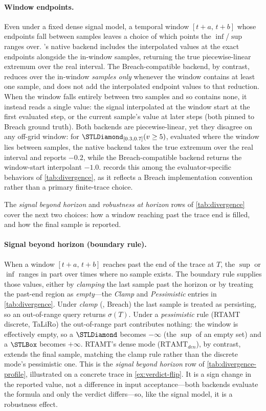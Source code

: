 \paragraph{Window endpoints.}
Even under a fixed dense signal model, a temporal window $[t+a,\,t+b]$ whose
endpoints fall between samples leaves a choice of which points the
$\inf$/$\sup$ ranges over. \tool's native backend includes the interpolated
values at the exact endpoints alongside the in-window samples, returning the
true piecewise-linear extremum over the real interval. The Breach-compatible
backend, by contrast, reduces over the in-window \emph{samples only} whenever
the window contains at least one sample, and does not add the interpolated
endpoint values to that reduction. When the window falls entirely between two
samples and so contains none, it instead reads a single value: the signal
interpolated at the window start at the first evaluated step, or the current
sample's value at later steps (both pinned to Breach ground truth). Both
backends are piecewise-linear, yet they disagree on any off-grid window: for
$\Eventually_{[0.3,0.7]}(v \geq 5)$, evaluated where the window lies between
samples, the native backend takes the true extremum over the real interval and
reports $-0.2$, while the Breach-compatible backend returns the window-start
interpolant $-1.0$. \tool records this among the evaluator-specific
behaviors of \cref{tab:divergence}, as it reflects a Breach implementation
convention rather than a primary finite-trace choice.

The \emph{signal beyond horizon} and \emph{robustness at horizon} rows of
\cref{tab:divergence} cover the next two choices: how a window reaching past
the trace end is filled, and how the final sample is reported.

\paragraph{Signal beyond horizon (boundary rule).}
When a window $[t+a,\,t+b]$ reaches past the end of the trace at $T$, the
$\sup$ or $\inf$ ranges in part over times where no sample exists. The boundary
rule supplies those values, either by \emph{clamping} the last sample past the
horizon or by treating the past-end region as \emph{empty}---the \emph{Clamp} and
\emph{Pessimistic} entries in \cref{tab:divergence}. Under \emph{clamp} (\tool, Breach) the last
sample is treated as persisting, so an out-of-range query returns $\sigma(T)$. Under
a \emph{pessimistic} rule (RTAMT discrete, TaLiRo) the out-of-range part contributes
nothing: the window is effectively empty, so a $\Eventually$ becomes $-\infty$
(the $\sup$ of an empty set) and a $\Always$ becomes $+\infty$.
RTAMT's dense mode ($\mathrm{RTAMT}_{den}$), by contrast, extends the final sample,
matching the clamp rule rather than the discrete mode's pessimistic one.
This is the \emph{signal beyond horizon} row of \cref{tab:divergence-profile},
illustrated on a concrete trace in \cref{ex:verdict-flip}. It is a sign change
in the reported value, not a difference in input acceptance---both backends
evaluate the formula and only the verdict differs---so, like the signal model,
it is a robustness effect.

